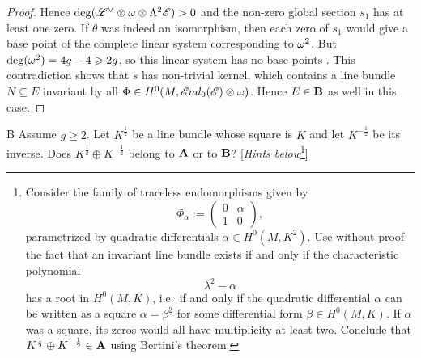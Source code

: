 \documentclass[A4paper, 12pt, british, reqno]{amsart}
\newcommand{\ot}{\otimes}
\newcommand{\op}{\oplus}
\newcommand{\dual}{^{\vee}}
\begin{document}
\begin{lm}
\begin{proof}
	Hence $\deg(\L\dual\ot\w\ot\Lambda^{2}\E)>0$ and the non-zero global section $s_{1}$ has at least one zero.
	If $\theta$ was indeed an isomorphism, then each zero of $s_{1}$ would give a base point of the complete linear system corresponding to $\omega^{2}$.
	But $\deg(\omega^{2})=4g-4\geqslant 2g$, so this linear system has no base points \cite[Corollary IV.3.2]{har77}.
	This contradiction shows that $s$ has non-trivial kernel, which contains a line bundle $N\subseteq E$ invariant by all $\Phi\in H^{0}(M,\sEnd_{0}(\E)\ot \w)$.
	Hence $E\in \mathbf{B}$ as well in this case.
    \end{proof}
\end{lm}

\begin{cexe}{B}
    Assume $g\geqslant 2$.
    Let $K^{\frac{1}{2}}$ be a line bundle whose square is $K$ and let $K^{-\frac{1}{2}}$ be its inverse.
    Does $K^{\frac{1}{2}}\op K^{-\frac{1}{2}}$ belong to $\mathbf{A}$ or to $\mathbf{B}$?
    [\textit{Hints below}\footnote{Consider the family of traceless endomorphisms given by 
    $$\Phi_{\alpha}:=\begin{pmatrix} 0 & \alpha \\ 1 & 0 \end{pmatrix},$$
	parametrized by quadratic differentials $\alpha\in H^{0}(M,K^{2})$. Use without proof the fact that an invariant line bundle exists if and only if the characteristic polynomial
	$$\lambda^{2}-\alpha$$
	has a root in $H^{0}(M,K)$, i.e.~if and only if the quadratic differential $\alpha$ can be written as a square $\alpha=\beta^{2}$ for some differential form $\beta\in H^{0}(M,K)$. If $\alpha$ was a square, its zeros would all have multiplicity at least two. Conclude that $K^{\frac{1}{2}}\op K^{-\frac{1}{2}}\in \bfA$ using Bertini's theorem.}]
\end{cexe}
\end{document}
